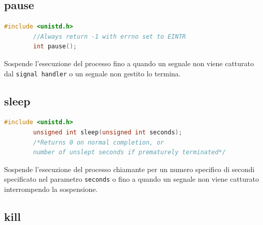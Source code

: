 \documentclass[a4paper, 12pt]{book}
\begin{document}
    \subsection{pause}

    \begin{lstlisting}[language=C]
        #include <unistd.h>
        //Always return -1 with errno set to EINTR
        int pause();
    \end{lstlisting}
    Sospende l'esecuzione del processo fino a quando un segnale 
    non viene catturato dal \verb|signal handler| o un 
    segnale non gestito lo termina.

    \subsection{sleep}

    \begin{lstlisting}[language=C]
        #include <unistd.h>
        unsigned int sleep(unsigned int seconds);
        /*Returns 0 on normal completion, or 
        number of unslept seconds if prematurely terminated*/
    \end{lstlisting}
    Sospende l'esecuzione del processo chiamante per un 
    numero specifico di secondi specificato nel parametro 
    \verb|seconds| o fino a quando un segnale non viene 
    catturato interrompendo la sospensione.

    \subsection{kill}
\end{document}
